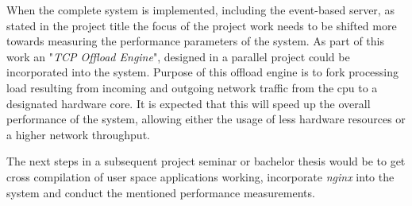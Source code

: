 When the complete system is implemented, including the event-based server, as stated in the project title the focus of the project work needs to be shifted more towards measuring the performance parameters of the system. As part of this work an "\textit{TCP Offload Engine}", designed in a parallel project could be incorporated into the system. Purpose of this offload engine is to fork processing load resulting from incoming and outgoing network traffic from the \gls{cpu} to a designated hardware core. It is expected that this will speed up the overall performance of the system, allowing either the usage of less hardware resources or a higher network throughput.

The next steps in a subsequent project seminar or bachelor thesis would be to get  cross compilation of user space applications working, incorporate \textit{nginx} into the system and conduct the mentioned performance measurements.